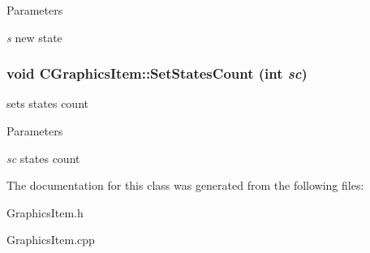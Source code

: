 \begin{DoxyParams}{Parameters}
\item[{\em s}]new state \end{DoxyParams}
\hypertarget{classCGraphicsItem_a4c3f6d8b84fad5e303f0fa29a4007aee}{
\subsubsection[{SetStatesCount}]{\setlength{\rightskip}{0pt plus 5cm}void CGraphicsItem::SetStatesCount (int {\em sc})}}
\label{classCGraphicsItem_a4c3f6d8b84fad5e303f0fa29a4007aee}
sets states count


\begin{DoxyParams}{Parameters}
\item[{\em sc}]states count \end{DoxyParams}


The documentation for this class was generated from the following files:\begin{DoxyCompactItemize}
\item 
GraphicsItem.h\item 
GraphicsItem.cpp\end{DoxyCompactItemize}
